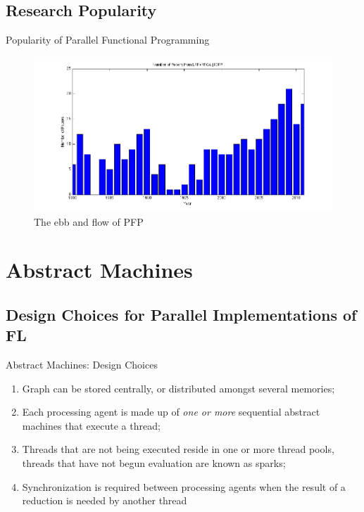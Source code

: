 \documentclass{beamer}
\begin{document}
\subsection[Research Popularity]{Research Popularity}

\begin{frame}[fragile]{Popularity of Parallel Functional Programming}{}
    \begin{figure}
    \centering
        \includegraphics[scale=.4]{figures/numPapers.png}
        \caption{The ebb and flow of PFP}
    \end{figure}

\end{frame}

\section{Abstract Machines}
\subsection[Design Choices for Parallel Implementations of Functional Languages]{Design Choices for Parallel Implementations of FL}

\begin{frame}{Abstract Machines: Design Choices \citep{clackBook}}
    \begin{enumerate}
        \item Graph can be stored centrally, or distributed amongst several memories;
        \item Each processing agent is made up of \emph{one or more} sequential abstract
                machines that execute a thread;
        \item Threads that are not being executed reside in one or more thread pools, threads
                that have not begun evaluation are known as sparks;
        \item Synchronization is required between processing agents when the result of a reduction
                is needed by another thread 
    \end{enumerate}
\end{frame}
\end{document}
